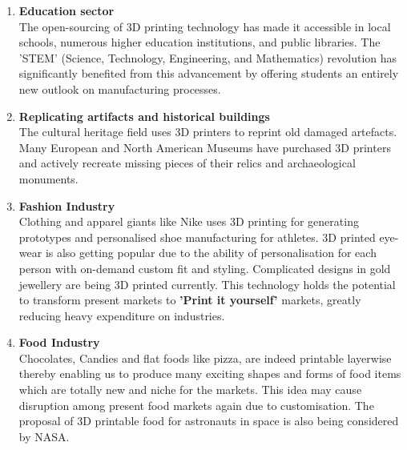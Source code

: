 \documentclass{report}
\begin{document}
{\begin{enumerate}
    \newpage
    \item \textbf{Education sector}
    \\The open-sourcing of 3D printing technology has made it accessible in local schools, numerous higher education institutions, and public libraries. The 'STEM' (Science, Technology, Engineering, and Mathematics) revolution has significantly benefited from this advancement by offering students an entirely new outlook on manufacturing processes.

    \item \textbf{Replicating artifacts and historical buildings}
    \\The cultural heritage field uses 3D printers to reprint old damaged artefacts. Many European and North American Museums have purchased 3D printers and actively recreate missing pieces of their relics and archaeological monuments.

    \item \textbf{Fashion Industry}
    \\Clothing and apparel giants like Nike uses 3D printing for generating prototypes and personalised shoe manufacturing for athletes. 3D printed eye-wear is also getting popular due to the ability of personalisation for each person with on-demand custom fit and styling. Complicated designs in gold jewellery are being 3D printed currently. This technology holds the potential to transform present markets to \textbf{'Print it yourself'} markets, greatly reducing heavy expenditure on industries.
    
    \item \textbf{Food Industry}
    \\Chocolates, Candies and flat foods like pizza, are indeed printable layerwise thereby enabling us to produce many exciting shapes and forms of food items which are totally new and niche for the markets. This idea may cause disruption among present food markets again due to customisation. The proposal of 3D printable food for astronauts in space is also being considered by NASA.
    
\end{enumerate}

}
\end{document}
